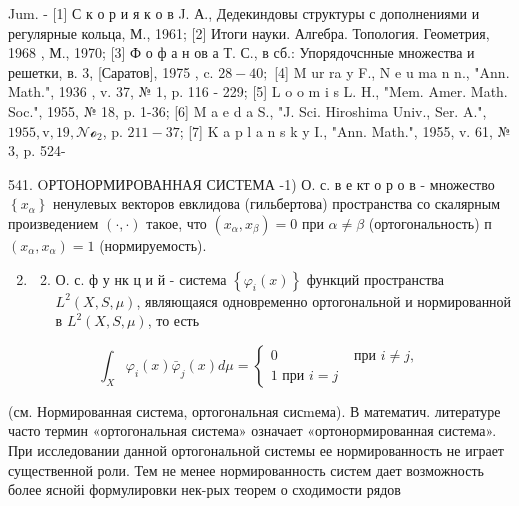 \documentclass[10pt]{article}
\begin{document}
Jum. - [1] С к о р и я к о в J. А., Дедекиндовы структуры с дополнениями и регулярные кольца, М., 1961; [2] Итоги науки. Алгебра. Топология. Геометрия, 1968 , М., 1970; [3] Ф о ф а н ов а Т. С., в сб.: Упорядочснные множества и решетки, в. 3, [Саратов], 1975 , c. $28-40 ;$ [4] M ur ra y F., N e u ma n n., "Ann. Math.", 1936 , v. 37, № 1, p. 116 - 229; [5] L o o m i s L. H., "Mem. Amer. Math. Soc.", 1955, № 18, p. 1-36; [6] M a e d a S., "J. Sci. Hiroshima Univ., Ser. A.", $1955, \mathrm{v}, 19, \mathcal{N o}_{2}$, p. $211-37$; [7] K a p l a n s k y I., "Ann. Math.", 1955, v. 61, № 3, p. 524-

541. OРТОНОРМИРОВАННАЯ СИСТЕМА -1) О. с. в е кт о р о в - множество $\left\{x_{\alpha}\right\}$ ненулевых векторов евклидова (гильбертова) пространства со скалярным произведением $(\cdot, \cdot)$ такое, что $\left(x_{\alpha}, x_{\beta}\right)=0$ при $\alpha \neq \beta$ (ортогональность) п $\left(x_{\alpha}, x_{\alpha}\right)=1$ (нормируемость).



\begin{enumerate}

  \setcounter{enumi}{1}

  \item 

  \begin{enumerate}

    \setcounter{enumii}{1}

    \item О. с. ф у нк ц и й - система $\left\{\varphi_{i}(x)\right\}$ функций пространства $L^{2}(X, S, \mu)$, являющаяся одновременно ортогональной и нормированной в $L^{2}(X, S, \mu)$, то есть

  \end{enumerate}

\end{enumerate}



\[

\int_{X} \varphi_{i}(x) \bar{\varphi}_{j}(x) d \mu= \begin{cases}0 & \text { при } i \neq j, \\ 1 \text { при } i=j\end{cases}

\]



(см. Нормированная система, ортогональная сисmема). В математич. литературе часто термин «ортогональная система» означает «ортонормированная система». При исследовании данной ортогональной системы ее нормированность не играет существенной роли. Тем не менее нормированность систем дает возможность более яснойі формулировки нек-рых теорем о сходимости рядов
\end{document}
